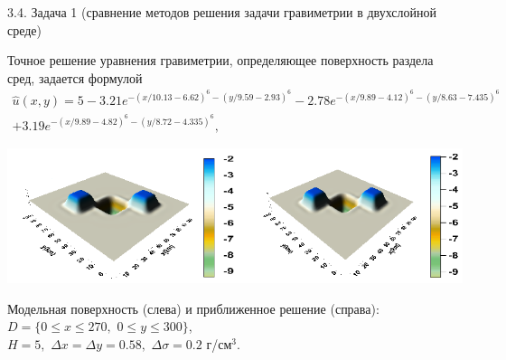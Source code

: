 \documentclass[10pt,pdf, mathserif, hyperref={unicode}]{beamer}
\begin{document}
\begin{frame}{3.4. Задача 1 (сравнение методов решения задачи гравиметрии в двухслойной среде)}
	
	Точное решение уравнения гравиметрии, определяющее поверхность раздела сред, задается формулой
	\begin{equation*}
	\begin{aligned}
	\hat{u}(x,y)=5-3.21e^{-(x/10.13-6.62)^6-(y/9.59-2.93)^6}-2.78e^{-(x/9.89-4.12)^6-(y/8.63-7.435)^6}\\+3.19e^{-(x/9.89-4.82)^6-(y/8.72-4.335)^6},
	\end{aligned} 
	\end{equation*}
	\centering
		
	\includegraphics[width=\textwidth, height=0.35\textheight]{gravy_kiev2014.png}
	
	Модельная поверхность (слева) и приближенное решение (справа): $D=\{0\leqslant x\leqslant 270, \,\,0\leqslant y\leqslant 300\}$, \\ $  H=5,\,\,\Delta x=\Delta y=0.58,\,\,\Delta\sigma=0.2$ г/см$^3$.
\end{frame}
\end{document}
